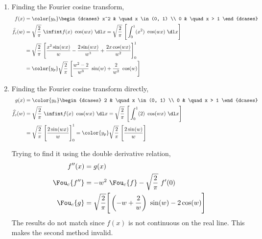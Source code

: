 \begin{enumerate}
    \item Finding the Fourier cosine transform,
          \begin{align}
              f(x)             & = \color{y_h} \begin{dcases}
                                                   x^2 & \quad x \in (0, 1) \\
                                                   0   & \quad x > 1
                                               \end{dcases}                \\
              \widehat{f}_c(w) & = \sqrt{\frac{2}{\pi}}\ \infint f(x)\ \cos(wx)\ \dl x
              = \sqrt{\frac{2}{\pi}}\ \Bigg[\int_{0}^{1} (x^2)
              \ \cos(wx)\ \dl x\Bigg]                                                  \\
                               & = \sqrt{\frac{2}{\pi}}\ \Bigg[ \frac{x^2 \sin(wx)}{w}
              - \frac{2\sin(wx)}{w^3} + \frac{2x\cos(wx)}{w^2} \Bigg]_0^1              \\
                               & = \color{y_p} \sqrt{\frac{2}{\pi}}
              \ \Bigg[ \frac{w^2 - 2}{w^3}\ \sin(w) + \frac{2}{w^2}\ \cos(w) \Bigg]
          \end{align}

    \item Finding the Fourier cosine transform directly,
          \begin{align}
              g(x)             & = \color{y_h} \begin{dcases}
                                                   2 & \quad x \in (0, 1) \\
                                                   0 & \quad x > 1
                                               \end{dcases}                  \\
              \widehat{f}_c(w) & = \sqrt{\frac{2}{\pi}}\ \infint f(x)\ \cos(wx)\ \dl x
              = \sqrt{\frac{2}{\pi}}\ \Bigg[\int_{0}^{1} (2)
              \ \cos(wx)\ \dl x\Bigg]                                                  \\
                               & = \sqrt{\frac{2}{\pi}}\ \Bigg[ \frac{2\sin(wx)}{w}
                  \Bigg]_0^1
              = \color{y_p} \sqrt{\frac{2}{\pi}} \ \Bigg[ \frac{2\sin(w)}{w} \Bigg]
          \end{align}

          Trying to find it using the double derivative relation,
          \begin{align}
              f''(x)        & = g(x)                                               \\
              \Fou_c\{f''\} & = -w^2\ \Fou_c\{f\} - \sqrt{\frac{2}{\pi}}\ f'(0)    \\
              \Fou_c \{g\}  & = \sqrt{\frac{2}{\pi}} \Bigg[\left( -w + \frac{2}{w}
                  \right) \ \sin(w) - 2\cos(w)\Bigg]
          \end{align}
          The results do not match since $ f(x) $ is not continuous on the real line.
          This makes the second method invalid.


\end{enumerate}
